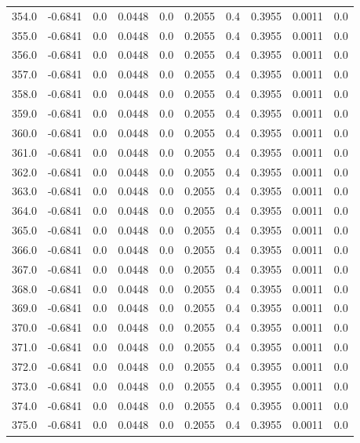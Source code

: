 \begin{longtable}{lrrrrrrrrr}
354.0 & -0.6841 & 0.0 & 0.0448 & 0.0 & 0.2055 & 0.4 & 0.3955 & 0.0011 & 0.0 \\
355.0 & -0.6841 & 0.0 & 0.0448 & 0.0 & 0.2055 & 0.4 & 0.3955 & 0.0011 & 0.0 \\
356.0 & -0.6841 & 0.0 & 0.0448 & 0.0 & 0.2055 & 0.4 & 0.3955 & 0.0011 & 0.0 \\
357.0 & -0.6841 & 0.0 & 0.0448 & 0.0 & 0.2055 & 0.4 & 0.3955 & 0.0011 & 0.0 \\
358.0 & -0.6841 & 0.0 & 0.0448 & 0.0 & 0.2055 & 0.4 & 0.3955 & 0.0011 & 0.0 \\
359.0 & -0.6841 & 0.0 & 0.0448 & 0.0 & 0.2055 & 0.4 & 0.3955 & 0.0011 & 0.0 \\
360.0 & -0.6841 & 0.0 & 0.0448 & 0.0 & 0.2055 & 0.4 & 0.3955 & 0.0011 & 0.0 \\
361.0 & -0.6841 & 0.0 & 0.0448 & 0.0 & 0.2055 & 0.4 & 0.3955 & 0.0011 & 0.0 \\
362.0 & -0.6841 & 0.0 & 0.0448 & 0.0 & 0.2055 & 0.4 & 0.3955 & 0.0011 & 0.0 \\
363.0 & -0.6841 & 0.0 & 0.0448 & 0.0 & 0.2055 & 0.4 & 0.3955 & 0.0011 & 0.0 \\
364.0 & -0.6841 & 0.0 & 0.0448 & 0.0 & 0.2055 & 0.4 & 0.3955 & 0.0011 & 0.0 \\
365.0 & -0.6841 & 0.0 & 0.0448 & 0.0 & 0.2055 & 0.4 & 0.3955 & 0.0011 & 0.0 \\
366.0 & -0.6841 & 0.0 & 0.0448 & 0.0 & 0.2055 & 0.4 & 0.3955 & 0.0011 & 0.0 \\
367.0 & -0.6841 & 0.0 & 0.0448 & 0.0 & 0.2055 & 0.4 & 0.3955 & 0.0011 & 0.0 \\
368.0 & -0.6841 & 0.0 & 0.0448 & 0.0 & 0.2055 & 0.4 & 0.3955 & 0.0011 & 0.0 \\
369.0 & -0.6841 & 0.0 & 0.0448 & 0.0 & 0.2055 & 0.4 & 0.3955 & 0.0011 & 0.0 \\
370.0 & -0.6841 & 0.0 & 0.0448 & 0.0 & 0.2055 & 0.4 & 0.3955 & 0.0011 & 0.0 \\
371.0 & -0.6841 & 0.0 & 0.0448 & 0.0 & 0.2055 & 0.4 & 0.3955 & 0.0011 & 0.0 \\
372.0 & -0.6841 & 0.0 & 0.0448 & 0.0 & 0.2055 & 0.4 & 0.3955 & 0.0011 & 0.0 \\
373.0 & -0.6841 & 0.0 & 0.0448 & 0.0 & 0.2055 & 0.4 & 0.3955 & 0.0011 & 0.0 \\
374.0 & -0.6841 & 0.0 & 0.0448 & 0.0 & 0.2055 & 0.4 & 0.3955 & 0.0011 & 0.0 \\
375.0 & -0.6841 & 0.0 & 0.0448 & 0.0 & 0.2055 & 0.4 & 0.3955 & 0.0011 & 0.0 \\

\end{longtable}
